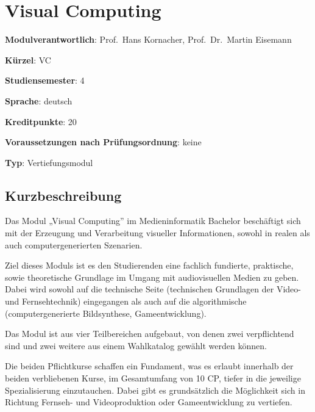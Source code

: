 \chapter{Visual Computing}\label{visual-computing}

\begin{modulHead}
\textbf{Modulverantwortlich}: Prof.~Hans Kornacher,
Prof.~Dr.~Martin
Eisemann
\end{modulHead}
\begin{modulHead}
\textbf{Kürzel}:
VC
\end{modulHead}
\begin{modulHead}
\textbf{Studiensemester}:
4
\end{modulHead}
\begin{modulHead}
\textbf{Sprache}:
deutsch
\end{modulHead}
\begin{modulHead}
\textbf{Kreditpunkte}:
20
\end{modulHead}
\begin{modulHead}
\textbf{Voraussetzungen nach
Prüfungsordnung}: keine
\end{modulHead}
\begin{modulHead}
\textbf{Typ}:
Vertiefungsmodul
\end{modulHead}


\section*{Kurzbeschreibung}\label{kurzbeschreibung-5}

Das Modul „Visual Computing'' im Medieninformatik Bachelor beschäftigt
sich mit der Erzeugung und Verarbeitung visueller Informationen, sowohl
in realen als auch computergenerierten Szenarien.

Ziel dieses Moduls ist es den Studierenden eine fachlich fundierte,
praktische, sowie theoretische Grundlage im Umgang mit audiovisuellen
Medien zu geben. Dabei wird sowohl auf die technische Seite (technischen
Grundlagen der Video- und Fernsehtechnik) eingegangen als auch auf die
algorithmische (computergenerierte Bildsynthese, Gameentwicklung).

Das Modul ist aus vier Teilbereichen aufgebaut, von denen zwei
verpflichtend sind und zwei weitere aus einem Wahlkatalog gewählt werden
können.

Die beiden Pflichtkurse schaffen ein Fundament, was es erlaubt innerhalb
der beiden verbliebenen Kurse, im Gesamtumfang von 10 CP, tiefer in die
jeweilige Spezialisierung einzutauchen. Dabei gibt es grundsätzlich die
Möglichkeit sich in Richtung Fernseh- und Videoproduktion oder
Gameentwicklung zu vertiefen.

